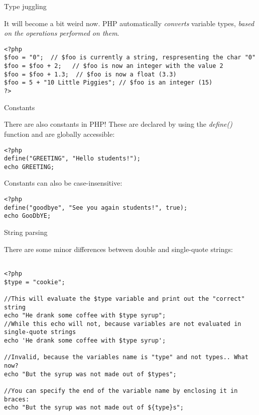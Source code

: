 \begin{frame}[fragile]{Type juggling}

	It will become a bit weird now. PHP automatically \emph{converts} variable types, \emph{based on the operations performed on them}.\pause
	\begin{lstlisting}
<?php
$foo = "0";  // $foo is currently a string, respresenting the char "0"
$foo = $foo + 2;   // $foo is now an integer with the value 2
$foo = $foo + 1.3;  // $foo is now a float (3.3)
$foo = 5 + "10 Little Piggies"; // $foo is an integer (15)
?>
	\end{lstlisting}
\end{frame}

\begin{frame}[fragile]{Constants}

There are also constants in PHP! These are declared by using the \emph{define()} function and are globally accessible: \pause

\begin{lstlisting}
<?php
define("GREETING", "Hello students!");
echo GREETING;
\end{lstlisting}
\pause

Constants can also be case-insensitive: \pause
\begin{lstlisting}
<?php
define("goodbye", "See you again students!", true);
echo GooDbYE;
\end{lstlisting}

\end{frame}

\begin{frame}[fragile]{String parsing}

There are some minor differences between double and single-quote strings: \pause

\begin{lstlisting}

<?php
$type = "cookie";

//This will evaluate the $type variable and print out the "correct" string
echo "He drank some coffee with $type syrup";
//While this echo will not, because variables are not evaluated in single-quote strings
echo 'He drank some coffee with $type syrup';

//Invalid, because the variables name is "type" and not types.. What now?
echo "But the syrup was not made out of $types";

//You can specify the end of the variable name by enclosing it in braces:
echo "But the syrup was not made out of ${type}s";
\end{lstlisting}

\end{frame}

